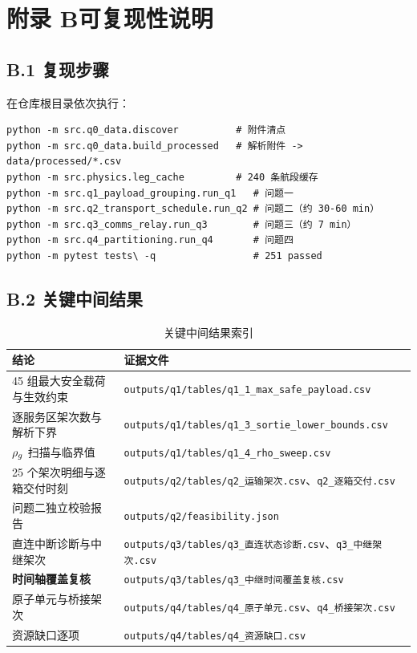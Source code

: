 \section*{附录 B\quad 可复现性说明}

\subsection*{B.1 复现步骤}

在仓库根目录依次执行：

\begin{verbatim}
python -m src.q0_data.discover          # 附件清点
python -m src.q0_data.build_processed   # 解析附件 -> data/processed/*.csv
python -m src.physics.leg_cache         # 240 条航段缓存
python -m src.q1_payload_grouping.run_q1   # 问题一
python -m src.q2_transport_schedule.run_q2 # 问题二（约 30-60 min）
python -m src.q3_comms_relay.run_q3        # 问题三（约 7 min）
python -m src.q4_partitioning.run_q4       # 问题四
python -m pytest tests\ -q                 # 251 passed
\end{verbatim}

\subsection*{B.2 关键中间结果}

\begin{table}[htbp]
	\caption{关键中间结果索引}
	\label{tab:evidence}
	\centering
	\begin{tabular}{p{7.4cm}p{7.2cm}}
		\toprule
		结论 & 证据文件 \\
		\midrule
		45 组最大安全载荷与生效约束 & \texttt{outputs/q1/tables/q1\_1\_max\_safe\_payload.csv} \\
		逐服务区架次数与解析下界 & \texttt{outputs/q1/tables/q1\_3\_sortie\_lower\_bounds.csv} \\
		$\rho_{g}$ 扫描与临界值 & \texttt{outputs/q1/tables/q1\_4\_rho\_sweep.csv} \\
		25 个架次明细与逐箱交付时刻 & \texttt{outputs/q2/tables/q2\_运输架次.csv}、\texttt{q2\_逐箱交付.csv} \\
		问题二独立校验报告 & \texttt{outputs/q2/feasibility.json} \\
		直连中断诊断与中继架次 & \texttt{outputs/q3/tables/q3\_直连状态诊断.csv}、\texttt{q3\_中继架次.csv} \\
		\textbf{时间轴覆盖复核} & \texttt{outputs/q3/tables/q3\_中继时间覆盖复核.csv} \\
		原子单元与桥接架次 & \texttt{outputs/q4/tables/q4\_原子单元.csv}、\texttt{q4\_桥接架次.csv} \\
		资源缺口逐项 & \texttt{outputs/q4/tables/q4\_资源缺口.csv} \\
		\bottomrule
	\end{tabular}
\end{table}

